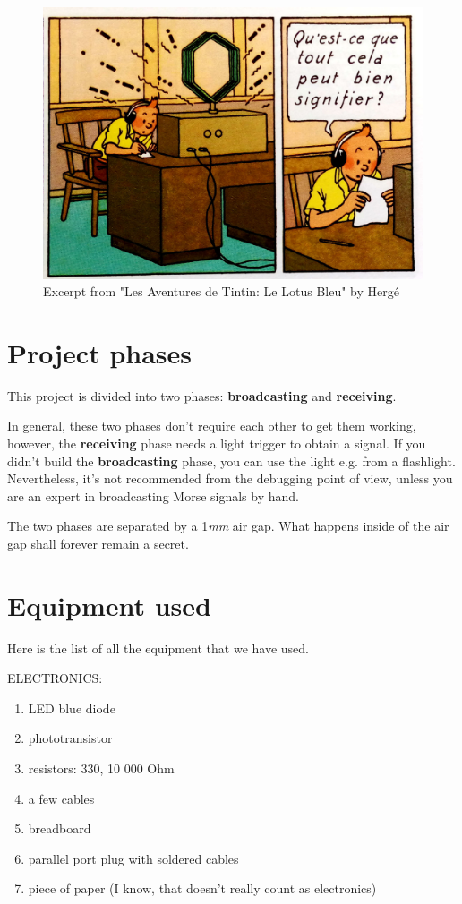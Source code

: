 \documentclass[12pt]{report}
\begin{document}
\begin{figure}[H]
\centering\includegraphics[scale=0.1]{le_lotus_bleu}
\caption{Excerpt from "Les Aventures de Tintin: Le Lotus Bleu" by Hergé}			
\label{fig:tintin}
\end{figure}


\section{Project phases}

This project is divided into two phases: \textbf{broadcasting} and \textbf{receiving}. 

In general, these two phases don't require each other to get them working, however, the \textbf{receiving} phase needs a light trigger to obtain a signal. If you didn't build the  \textbf{broadcasting} phase, you can use the light e.g. from a flashlight. Nevertheless, it's not recommended from the debugging point of view, unless you are an expert in broadcasting Morse signals by hand.

The two phases are separated by a 1\textit{mm} air gap. What happens inside of the air gap shall forever remain a secret.

\section{Equipment used} \label{sec:equip}

Here is the list of all the equipment that we have used.

ELECTRONICS:

\begin{enumerate}

\item LED blue diode
\item phototransistor
\item resistors: 330, 10 000 Ohm
\item a few cables
\item breadboard
\item parallel port plug with soldered cables
\item piece of paper (I know, that doesn't really count as electronics)

\end{enumerate}
\end{document}
